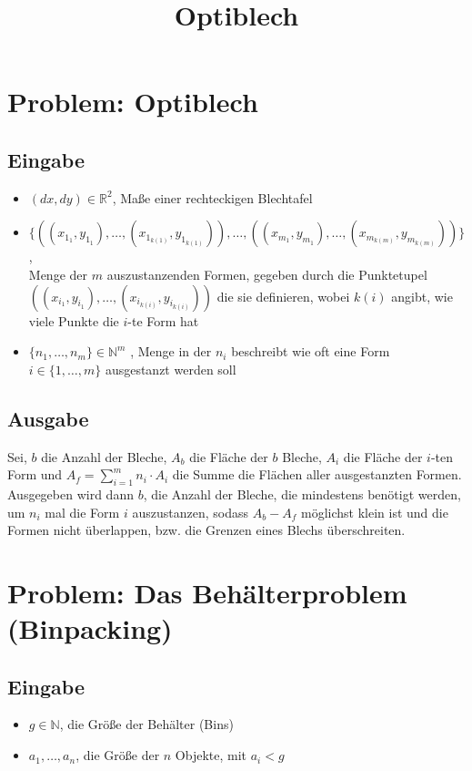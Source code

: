\documentclass{scrartcl}
\title{Optiblech}
\begin{document}
\maketitle

\section*{Problem: Optiblech}

\subsection*{Eingabe}

\begin{itemize}
\item{$(dx, dy) \in \mathbb{R}^{2}$, Ma{\ss}e einer rechteckigen Blechtafel}
\item{$\{((x_{1_{1}}, y_{1_{1}}), \ldots , (x_{1_{k(1)}}, y_{1_{k(1)}})), \ldots , ((x_{m_{1}}, y_{m_{1}}), \ldots , (x_{m_{k(m)}}, y_{m_{k(m)}}))\}$, \\ Menge der $m$ auszustanzenden Formen, gegeben durch die Punktetupel \\ $((x_{i_{1}}, y_{i_{1}}), \ldots , (x_{i_{k(i)}}, y_{i_{k(i)}}))$ die sie definieren, wobei $k(i)$ angibt, wie viele Punkte die $i$-te Form hat}
\item{$\{n_{1}, \ldots , n_{m}\} \in \mathbb{N}^{m}$} , Menge in der $n_{i}$ beschreibt wie oft eine Form $i \in \{1, \ldots, m\}$ ausgestanzt werden soll
\end{itemize}

\subsection*{Ausgabe}
Sei, $b$ die Anzahl der Bleche, $A_{b}$ die Fl\"ache der $b$ Bleche, $A_{i}$ die Fl\"ache der $i$-ten Form und $A_{f} = \sum_{i=1}^{m} n_{i} \cdot A_{i}$ die Summe die Fl\"achen aller ausgestanzten Formen.
Ausgegeben wird dann $b$, die Anzahl der Bleche, die mindestens ben\"otigt werden, um $n_{i}$ mal die Form $i$ auszustanzen, sodass $A_{b} - A_{f}$ m\"oglichst klein ist und die Formen nicht \"uberlappen, bzw. die Grenzen eines Blechs \"uberschreiten.

\section*{Problem: Das Beh\"alterproblem (Binpacking)}
\subsection*{Eingabe}
\begin{itemize}
\item{$g \in \mathbb{N}$, die Gr\"o{\ss}e der Beh\"alter (Bins)}
\item{$a_{1}, \ldots, a_{n}$, die Gr\"o{\ss}e der $n$ Objekte, mit $a_{i} < g$}
\end{itemize}
\end{document}
